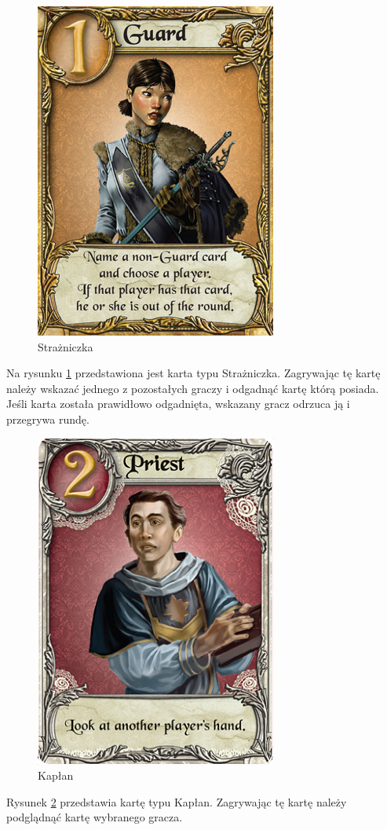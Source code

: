 \clearpage
\begin{figure}[h]
	\centering
	\includegraphics[scale=0.5]{Resources/Love_Letter_Card_Guard.png}
	\caption{Strażniczka} \label{fig:Love_Letter_Card_Guard}
\end{figure}
Na rysunku \ref{fig:Love_Letter_Card_Guard} przedstawiona jest karta typu Strażniczka. Zagrywając tę kartę należy wskazać jednego z pozostałych graczy i odgadnąć kartę którą posiada. Jeśli karta została prawidłowo odgadnięta, wskazany gracz odrzuca ją i przegrywa rundę.

\begin{figure}[h]
	\centering
	\includegraphics[scale=0.5]{Resources/Love_Letter_Card_Priest.png}
	\caption{Kapłan} \label{fig:Love_Letter_Card_Priest}
\end{figure}
Rysunek \ref{fig:Love_Letter_Card_Priest} przedstawia kartę typu Kapłan. Zagrywając tę kartę należy podglądnąć kartę wybranego gracza.

